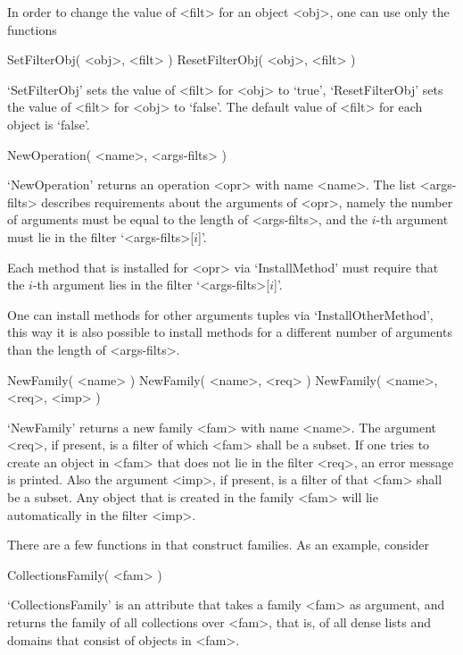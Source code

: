 In order to change the value of <filt> for an object <obj>,
one can use only the functions

\>SetFilterObj( <obj>, <filt> )
\>ResetFilterObj( <obj>, <filt> )

`SetFilterObj' sets the value of <filt> for <obj> to `true',
`ResetFilterObj' sets the value of <filt> for <obj> to `false'.
The default value of <filt> for each object is `false'.




\>NewOperation( <name>, <args-filts> )

`NewOperation' returns an operation <opr> with name <name>.
The list <args-filts> describes requirements about the arguments
of <opr>, namely the number of arguments must be equal to the length of
<args-filts>, and the $i$-th argument must lie in the filter
`<args-filts>[$i$]'.

Each method that is installed for <opr> via `InstallMethod' must require
that the $i$-th argument lies in the filter `<args-filts>[$i$]'.

One can install methods for other arguments tuples via
`InstallOtherMethod',
this way it is also possible to install methods for a different number
of arguments than the length of <args-filts>.



\>NewFamily( <name> )
\)NewFamily( <name>, <req> )
\)NewFamily( <name>, <req>, <imp> )

`NewFamily' returns a new family <fam> with name <name>.
The argument <req>, if present, is a filter of which <fam> shall be a
subset.
If one tries to create an object in <fam> that does not lie in the filter
<req>, an error message is printed.
Also the argument <imp>, if present, is a filter of that <fam> shall be a
subset.
Any object that is created in the family <fam> will lie automatically in
the filter <imp>.

There are a few functions in {\GAP} that construct families.
As an example, consider

\>CollectionsFamily( <fam> )

`CollectionsFamily' is an attribute that takes a family <fam> as
argument, and returns the family of all collections over <fam>,
that is, of all dense lists and domains that consist of objects in
<fam>.

